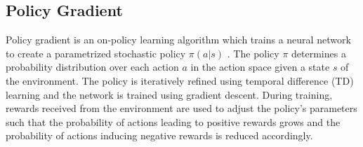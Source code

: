 \documentclass[10pt,journal,compsoc]{IEEEtran}
\begin{document}
\subsection{Policy Gradient}
Policy gradient is an on-policy learning algorithm which trains a neural network to create a parametrized stochastic policy $\pi(a|s)$ \cite{sutton1999policy}.
The policy $\pi$ determines a probability distribution over each action $a$ in the action space given a state $s$ of the environment.
The policy is iteratively refined using temporal difference (TD) learning \cite{sutton1988learning} and the network is trained using gradient descent.
During training, rewards received from the environment are used to adjust the policy's parameters such that the probability of actions leading to positive rewards grows and the probability of actions inducing negative rewards is reduced accordingly.
\end{document}
